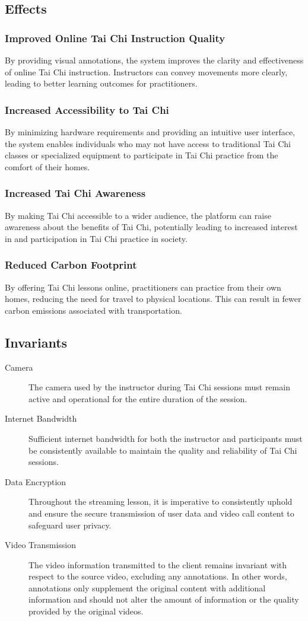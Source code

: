 \documentclass[12pt]{article}
\begin{document}
\subsection{Effects}
\subsubsection{Improved Online Tai Chi Instruction Quality}
By providing visual annotations, the system improves the clarity and effectiveness of online Tai Chi instruction. Instructors can convey movements more clearly, leading to better learning outcomes for practitioners.
\subsubsection{Increased Accessibility to Tai Chi}
By minimizing hardware requirements and providing an intuitive user interface, the system enables individuals who may not have access to traditional Tai Chi classes or specialized equipment to participate in Tai Chi practice from the comfort of their homes.
\subsubsection{Increased Tai Chi Awareness}
By making Tai Chi accessible to a wider audience, the platform can raise awareness about the benefits of Tai Chi, potentially leading to increased interest in and participation in Tai Chi practice in society.
\subsubsection{Reduced Carbon Footprint}
By offering Tai Chi lessons online, practitioners can practice from their own homes, reducing the need for travel to physical locations. This can result in fewer carbon emissions associated with transportation.

\subsection{Invariants}
\begin{description}
    \item[Camera] The camera used by the instructor during Tai Chi sessions must remain active and operational for the entire duration of the session.
    \item[Internet Bandwidth] Sufficient internet bandwidth for both the instructor and participants must be consistently available to maintain the quality and reliability of Tai Chi sessions.
    \item[Data Encryption] Throughout the streaming lesson, it is imperative to consistently uphold and ensure the secure transmission of user data and video call content to safeguard user privacy.
    \item[Video Transmission] The video information transmitted to the client remains invariant with respect to the source video, excluding any annotations. In other words, annotations only supplement the original content with additional information and should not alter the amount of information or the quality provided by the original videos.
\end{description}
\end{document}
